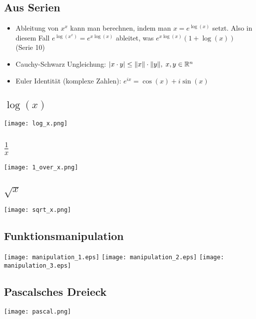\subsection{Aus Serien}
\begin{itemize}[leftmargin=*]
	\item Ableitung von $x^x$ kann man berechnen, indem man $x = e^{\log(x)}$
	setzt. Also in diesem Fall $e^{\log(x^x)} = e^{x \log(x)}$ ableitet, was $e^{x
	\log(x)} (1 + \log(x))$ (Serie 10)
	\item Cauchy-Schwarz Ungleichung: $|x \cdot y| \leq \|x\| \cdot \|y\|, \; x,y \in \mathbb{R}^n$
	\item Euler Identität (komplexe Zahlen): $e^{ix} = \cos(x) + i \sin(x)$
\end{itemize}

\begin{landscape}\begin{multicols}{3}

\subsection{\texorpdfstring{$\log(x)$}{log(x)}}
\texttt{[image: log\_x.png]}

\subsection{\texorpdfstring{$\frac{1}{x}$}{1/x}}
\texttt{[image: 1\_over\_x.png]}

\subsection{\texorpdfstring{$\sqrt{x}$}{x^(1/x)}}
\texttt{[image: sqrt\_x.png]}

\subsection{Funktionsmanipulation}
\texttt{[image: manipulation\_1.eps]}
\texttt{[image: manipulation\_2.eps]}
\texttt{[image: manipulation\_3.eps]}

\subsection{Pascalsches Dreieck}
\texttt{[image: pascal.png]}

\end{multicols}\end{landscape}
